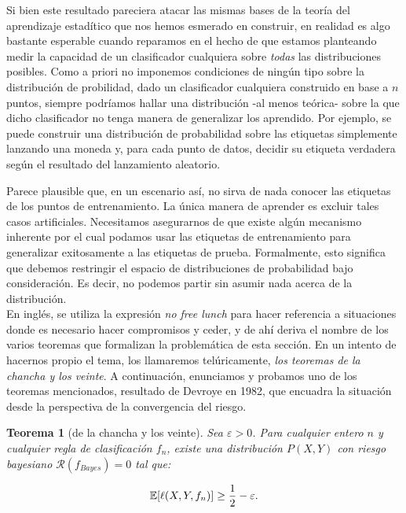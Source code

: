 \documentclass{report}
\newtheorem{thm}{Teorema}[section]
\begin{document}
Si bien este resultado pareciera atacar las mismas bases de la teoría del aprendizaje estadítico que nos hemos esmerado en 
construir, en realidad es algo bastante esperable cuando reparamos en el hecho de que estamos planteando
medir la capacidad de un clasificador cualquiera sobre \textit{todas} las distribuciones posibles. Como a priori
no imponemos condiciones de ningún tipo sobre la distribución de probilidad, dado un clasificador cualquiera construido
en base a $n$ puntos, siempre podríamos hallar una distribución -al menos teórica- sobre la que dicho clasificador no tenga
manera de generalizar los aprendido. Por ejemplo, se puede construir una distribución de probabilidad sobre las etiquetas simplemente 
lanzando una moneda y, para cada punto de datos, decidir su etiqueta verdadera según el resultado del 
lanzamiento aleatorio. \newline

Parece plausible que, en un escenario así, no sirva de nada conocer las etiquetas de los puntos de 
entrenamiento. La única manera de aprender es excluir tales casos artificiales. Necesitamos asegurarnos 
de que existe algún mecanismo inherente por el cual podamos usar las etiquetas de entrenamiento para 
generalizar exitosamente a las etiquetas de prueba. Formalmente, esto significa que debemos restringir 
el espacio de distribuciones de probabilidad bajo consideración. Es decir, no podemos partir sin asumir
nada acerca de la distribución.\\

En inglés, se utiliza la expresión \textit{no free lunch} para hacer referencia
a situaciones donde es necesario hacer compromisos y ceder, y de ahí deriva el nombre de los varios teoremas
que formalizan la problemática de esta sección. En un intento de hacernos propio el tema, los llamaremos 
telúricamente, \textit{los teoremas de la chancha y los veinte}. 
A continuación, enunciamos y probamos uno de los teoremas mencionados, resultado de Devroye en 1982, que encuadra la
situación desde la perspectiva de la convergencia del riesgo.\newline


\begin{thm}[de la chancha y los veinte]
Sea \(\varepsilon > 0\). Para cualquier entero \(n\) y cualquier 
regla de clasificación \(f_n\), existe una distribución \(P(X, Y)\) con riesgo bayesiano 
\(\mathcal{R}(f_{Bayes}) = 0\) tal que:

\[
\mathbb{E}[\ell(X,Y,f_n)] \geq \frac{1}{2} - \varepsilon.\newline
\]
\end{thm}
\end{document}
